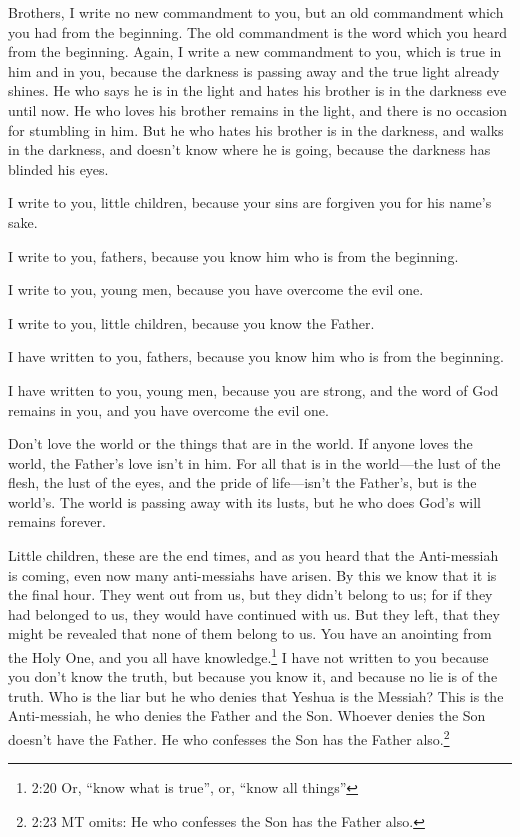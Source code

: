 \myverse{}Brothers, I write no new commandment to you, but an old commandment which you had from the beginning. The old commandment is the word which you heard from the beginning. \myverse{}Again, I write a new commandment to you, which is true in him and in you, because the darkness is passing away and the true light already shines. \myverse{}He who says he is in the light and hates his brother is in the darkness eve until now. \myverse{}He who loves his brother remains in the light, and there is no occasion for stumbling in him. \myverse{}But he who hates his brother is in the darkness, and walks in the darkness, and doesn’t know where he is going, because the darkness has blinded his eyes.


\myverse{}I write to you, little children, because your sins are forgiven
you for his name’s sake.


\myverse{}I write to you, fathers, because you know him who is from the
beginning.

I write to you, young men, because you have overcome the evil one.

I write to you, little children, because you know the Father.


\myverse{}I have written to you, fathers, because you know him who is from
the beginning.

I have written to you, young men, because you are strong, and the word of God remains in you, and you have overcome the evil one.


\myverse{}Don’t love the world or the things that are in the world. If anyone loves the world, the Father’s love isn’t in him. \myverse{}For all that is in the world—the lust of the flesh, the lust of the eyes, and the pride of life—isn’t the Father’s, but is the world’s. \myverse{}The world is passing away with its lusts, but he who does God’s will remains forever.


\myverse{}Little children, these are the end times, and as you heard that the Anti-messiah is coming, even now many anti-messiahs have arisen. By this we know that it is the final hour. \myverse{}They went out from us, but they didn’t belong to us; for if they had belonged to us, they would have continued with us. But they left, that they might be revealed that none of them belong to us. \myverse{}You have an anointing from the Holy One, and you all have knowledge.\footnote{ 2:20 Or, “know what is true”, or, “know all things”} \myverse{}I have not written to you because you don’t know the truth, but because you know it, and because no lie is of the truth. \myverse{}Who is the liar but he who denies that Yeshua is the Messiah? This is the Anti-messiah, he who denies the Father and the Son. \myverse{}Whoever denies the Son doesn’t have the Father. He who confesses the Son has the Father also.\footnote{ 2:23 MT omits: He who confesses the Son has the Father also.}


